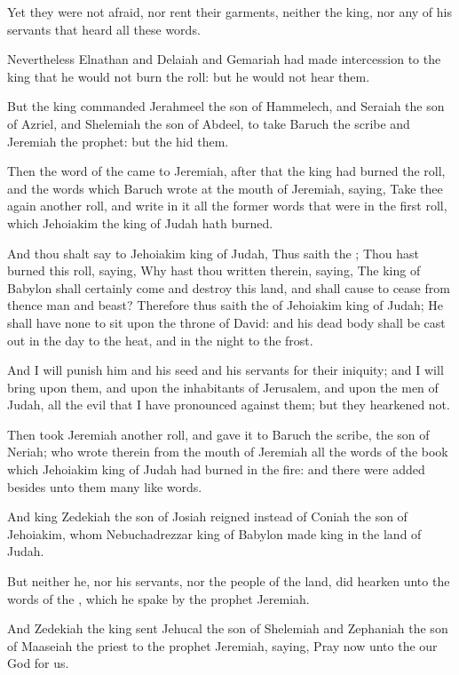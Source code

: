 \Verse Yet they were not afraid, nor rent their garments, neither the king, nor any of his servants that heard all these words.

\Verse Nevertheless Elnathan and Delaiah and Gemariah had made intercession to the king that he would not burn the roll: but he would not hear them.

\Verse But the king commanded Jerahmeel the son of Hammelech, and Seraiah the son of Azriel, and Shelemiah the son of Abdeel, to take Baruch the scribe and Jeremiah the prophet: but the \LORD hid them.

\Verse Then the word of the \LORD came to Jeremiah, after that the king had burned the roll, and the words which Baruch wrote at the mouth of Jeremiah, saying, \Verse Take thee again another roll, and write in it all the former words that were in the first roll, which Jehoiakim the king of Judah hath burned.

\Verse And thou shalt say to Jehoiakim king of Judah, Thus saith the \LORD; Thou hast burned this roll, saying, Why hast thou written therein, saying, The king of Babylon shall certainly come and destroy this land, and shall cause to cease from thence man and beast?  \Verse Therefore thus saith the \LORD of Jehoiakim king of Judah; He shall have none to sit upon the throne of David: and his dead body shall be cast out in the day to the heat, and in the night to the frost.

\Verse And I will punish him and his seed and his servants for their iniquity; and I will bring upon them, and upon the inhabitants of Jerusalem, and upon the men of Judah, all the evil that I have pronounced against them; but they hearkened not.

\Verse Then took Jeremiah another roll, and gave it to Baruch the scribe, the son of Neriah; who wrote therein from the mouth of Jeremiah all the words of the book which Jehoiakim king of Judah had burned in the fire: and there were added besides unto them many like words.


\Chapter
\Verse And king Zedekiah the son of Josiah reigned instead of Coniah the son of Jehoiakim, whom Nebuchadrezzar king of Babylon made king in the land of Judah.

\Verse But neither he, nor his servants, nor the people of the land, did hearken unto the words of the \LORD, which he spake by the prophet Jeremiah.

\Verse And Zedekiah the king sent Jehucal the son of Shelemiah and Zephaniah the son of Maaseiah the priest to the prophet Jeremiah, saying, Pray now unto the \LORD our God for us.

